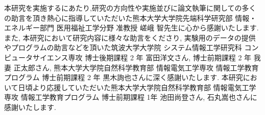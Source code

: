 
\begin{thanks}
本研究を実施するにあたり,研究の方向性や実施並びに論文執筆に関しての多くの助言を頂き熱心に指導していただいた熊本大学大学院先端科学研究部 情報・エネルギー部門 医用福祉工学分野 准教授 嵯峨 智先生に心から感謝いたします. また, 本研究において研究内容に様々な助言をくださり, 実験用のデータの提供やプログラムの助言などを頂いた筑波大学大学院 システム情報工学研究科 コンピュータサイエンス専攻 博士後期課程 2 年 富田洋文さん, 博士前期課程 2 年 我妻 正太郎さん, 熊本大学大学院自然科学教育部 情報電気工学専攻 情報工学教育プログラム 博士前期課程 2 年 黒木詢也さんに深く感謝いたします. 
本研究において日頃より応援していただいた熊本大学大学院自然科学教育部 情報電気工学専攻 情報工学教育プログラム 博士前期課程 1年 池田尚登さん, 石丸嵩也さんに感謝いたします.
\end{thanks}
